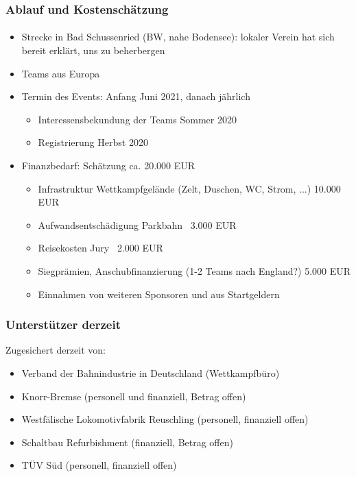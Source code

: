 \documentclass[slidestop,compress,mathserif, aspectratio = 169]{beamer}
\begin{document}
{\begin{frame}
\frametitle{Ablauf und Kostensch\"atzung}
\framesubtitle{}
\begin{itemize}
\item Strecke in Bad Schussenried (BW, nahe Bodensee): lokaler Verein hat sich bereit erklärt, uns zu beherbergen
\item Teams aus Europa
\item Termin des Events: Anfang Juni 2021, danach jährlich
\begin{itemize}
		\item Interessensbekundung der Teams Sommer 2020
		\item Registrierung Herbst 2020
		\end{itemize} 
\item Finanzbedarf: Schätzung ca. 20.000 EUR
\begin{itemize}
		\item Infrastruktur Wettkampfgelände (Zelt, Duschen, WC, Strom, ...) 10.000 EUR
    		\item Aufwandsentschädigung Parkbahn ~3.000 EUR
   		\item  Reisekosten Jury ~2.000 EUR
    		\item Siegprämien, Anschubfinanzierung (1-2 Teams nach England?) 5.000 EUR
    		\item Einnahmen von weiteren Sponsoren und aus Startgeldern		
		\end{itemize}
		\end{itemize}
\end{frame}
		
\begin{frame}
\frametitle{Unterst\"utzer derzeit}
Zugesichert derzeit von:
\begin{itemize}
		\item Verband der Bahnindustrie in Deutschland (Wettkampfb\"uro)
		\item Knorr-Bremse (personell und finanziell, Betrag offen)
		\item Westf\"alische Lokomotivfabrik Reuschling (personell, finanziell offen)
		\item Schaltbau Refurbishment (finanziell, Betrag offen)
		\item T\"UV S\"ud (personell, finanziell offen)
\end{itemize}
\end{frame}

}
\end{document}
